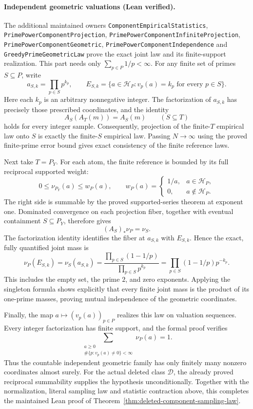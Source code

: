 \documentclass[11pt]{article}
\theoremstyle{definition}
\begin{document}
\paragraph{Independent geometric valuations (Lean verified).}
The additional maintained owners
\texttt{ComponentEmpiricalStatistics},
\texttt{PrimePowerComponentProjection},
\texttt{PrimePowerComponentInfiniteProjection},
\texttt{PrimePowerComponentGeometric},
\texttt{PrimePowerComponentIndependence} and
\texttt{GreedyPrimeGeometricLaw} prove the exact joint law and its
finite-support realization. This part needs only
\(\sum_{p\in P}1/p<\infty\).
For any finite set of primes \(S\subseteq P\), write
\[
 a_{S,k}=\prod_{p\in S}p^{k_p},
 \qquad
 E_{S,k}=\{a\in\mathcal H_P:v_p(a)=k_p
                                  \text{ for every }p\in S\}.
\]
Here each \(k_p\) is an arbitrary nonnegative integer.
The factorization of \(a_{S,k}\) has precisely those prescribed
coordinates, and the identity
\[
 A_S(A_T(m))=A_S(m)\qquad(S\subseteq T)
\]
holds for every integer sample. Consequently, projection of the
finite-\(T\) empirical law onto \(S\) is exactly the finite-\(S\)
empirical law. Passing \(N\to\infty\) using the proved finite-prime
error bound gives exact consistency of the finite reference laws.

Next take \(T=P_Y\). For each atom, the finite reference is bounded
by its full reciprocal supported weight:
\[
 0\le \nu_{P_Y}(a)\le w_P(a),\qquad
 w_P(a)=
 \begin{cases}
   1/a,&a\in\mathcal H_P,\\
   0,&a\notin\mathcal H_P.
 \end{cases}
\]
The right side is summable by the proved supported-series theorem
at exponent one. Dominated convergence on each projection fiber,
together with eventual containment \(S\subseteq P_Y\), therefore gives
\[
 (A_S)_*\nu_P=\nu_S.
\]
The factorization identity identifies the fiber at \(a_{S,k}\) with
\(E_{S,k}\). Hence the exact, fully quantified joint mass is
\[
 \nu_P(E_{S,k})
   =\nu_S(a_{S,k})
   =\frac{\prod_{p\in S}(1-1/p)}
           {\prod_{p\in S}p^{k_p}}
   =\prod_{p\in S}(1-1/p)p^{-k_p}.
\]
This includes the empty set, the prime \(2\), and zero exponents.
Applying the singleton formula shows explicitly that every finite
joint mass is the product of its one-prime masses, proving mutual
independence of the geometric coordinates.

Finally, the map \(a\mapsto(v_p(a))_{p\in P}\) realizes this law on
valuation sequences. Every integer factorization has finite support,
and the formal proof verifies
\[
 \sum_{\substack{a\ge0\\
          \#\{p:v_p(a)\ne0\}<\infty}}\nu_P(a)=1.
\]
Thus the countable independent geometric family has only finitely
many nonzero coordinates almost surely. For the actual deleted class
\(\mathcal D\), the already proved reciprocal summability supplies
the hypothesis unconditionally. Together with the normalization,
literal sampling law and statistic contraction above, this completes
the maintained Lean proof of
Theorem~\ref{thm:deleted-component-sampling-law}.
\end{document}
